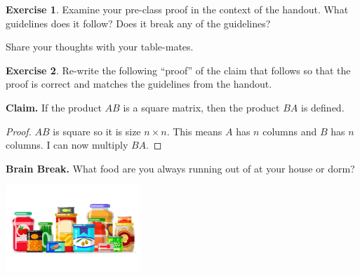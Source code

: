 \documentclass{beamer}
\newcommand{\fn}{\insertframenumber}
\theoremstyle{definition}
\newtheorem{exercise}{Exercise}
\begin{document}
\begin{frame}{\fn}
	\begin{exercise}
		Examine your pre-class proof in the context of the handout.  What guidelines does it follow? Does it break any of the guidelines? 
		
		Share your thoughts with your table-mates.
	\end{exercise}
\end{frame}

\begin{frame}{\fn}
	\begin{exercise}
		Re-write the following ``proof'' of the claim that follows so that the proof is correct and matches the guidelines from the handout.
		\begin{block}{\textbf{Claim.}}
			If the product $AB$ is a square matrix, then the product $BA$ is defined.
		\end{block}
		\begin{proof}
			$AB$ is square so it is size $n\times n$. This means $A$ has $n$ columns and $B$ has $n$ columns. I can now multiply $BA$.
		\end{proof}
	\end{exercise}
\end{frame}
\begin{frame}{\fn}
	\begin{block}{\textbf{Brain Break.}}
		What food are you always running out of at your house or dorm?
		\begin{center}
			\includegraphics[width=2in]{../images/pantry}
		\end{center}
	\end{block}
\end{frame}
\end{document}
